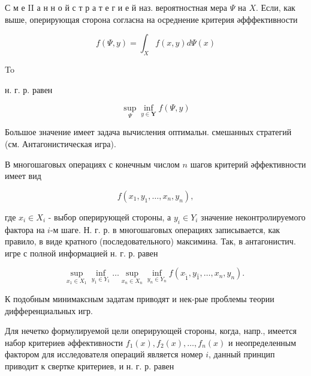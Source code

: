 \documentclass[10pt]{article}
\begin{document}
С м е II а н н о й с т р а т е г и е й наз. вероятностная мера $\Psi$ на $X$. Если, как выше, оперирующая сторона согласна на осреднение критерия әфффективности



\[

f(\Psi, y)=\int_{X} f(x, y) d \Psi(x)

\]



To



н. г. р. равен



\[

\sup _{\Psi} \inf _{y \in \boldsymbol{Y}} f(\Psi, y)

\]



Большое значение имеет задача вычисления оптимальн. смешанных стратегий (см. Антагонистическая игра).



В многошаговых операциях с конечным числом $n$ шагов критерий әффективности имеет вид



\[

f\left(x_{1}, y_{1}, \ldots, x_{n}, y_{n}\right),

\]



где $x_{i} \in X_{i}$ - выбор оперирующей стороны, а $y_{i} \in Y_{i}$ значение неконтролируемого фактора на $i$-м шаге. Н. г. р. в многошаговых операциях записывается, как правило, в виде кратного (последовательного) максимина. Так, в антагонистич. игре с полной информацией н. г. р. равен



\[

\sup _{x_{1} \in X_{1}} \inf _{y_{1} \in Y_{1}} \ldots \sup _{x_{n} \in X_{n}} \inf _{y_{n} \in Y_{n}} f\left(x_{\tilde{1}}, y_{\hat{1}}, \ldots, x_{n}, y_{n}\right) \text {. }

\]



К подобным минимаксным задатам приводят и нек-рые проблемы теории дифференциальных игр.



Для нечетко формулируемой цели оперирующей стороны, когда, напр., имеется набор критериев әффективности $f_{1}(x), f_{2}(x), \ldots, f_{n}(x)$ и неопределенным фактором для исследователя операций является номер $i$, данный принцип приводит к свертке критериев, и н. г. р. равен
\end{document}
